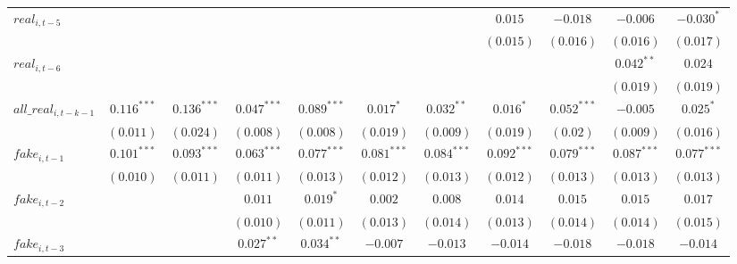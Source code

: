 \begin{table}
\begin{center}
\begin{tabular}{lcccccccccc}
\addlinespace
$real_{i, t-5}$          &                &               &                &                &                &                & $0.015$        & $-0.018$       & $-0.006$       & $-0.030^{*}$   \\
                         &                &               &                &                &                &                & $(0.015)$      & $(0.016)$      & $(0.016)$      & $(0.017)$      \\
\addlinespace
$real_{i, t-6}$       &                &               &                &                &                &                &                &                & $0.042^{**}$   & $0.024$        \\
                         &                &               &                &                &                &                &                &                & $(0.019)$      & $(0.019)$      \\
\addlinespace
$all\_real_{i, t-k-1}$  & $0.116^{***}$  & $0.136^{***}$   & $0.047^{***}$  & $0.089^{***}$ &  $0.017^{*}$    & $0.032^{**}$   & $0.016^{*}$    & $0.052^{***}$  &  $-0.005$       & $0.025^{*}$\\
                        & $(0.011)$      & $(0.024)$ &$(0.008)$      & $(0.008)$      & $(0.019)$      & $(0.009)$      & $(0.019)$   & $(0.02)$ & $(0.009)$      & $(0.016)$\\
\addlinespace
$fake_{i, t-1}$         & $0.101^{***}$  & $0.093^{***}$ & $0.063^{***}$  & $0.077^{***}$  & $0.081^{***}$  & $0.084^{***}$  & $0.092^{***}$  & $0.079^{***}$  & $0.087^{***}$  & $0.077^{***}$  \\
                         & $(0.010)$      & $(0.011)$     & $(0.011)$      & $(0.013)$      & $(0.012)$      & $(0.013)$      & $(0.012)$      & $(0.013)$      & $(0.013)$      & $(0.013)$      \\
\addlinespace
$fake_{i, t-2}$        &                &               & $0.011$        & $0.019^{*}$    & $0.002$        & $0.008$        & $0.014$        & $0.015$        & $0.015$        & $0.017$        \\
                         &                &               & $(0.010)$      & $(0.011)$      & $(0.013)$      & $(0.014)$      & $(0.013)$      & $(0.014)$      & $(0.014)$      & $(0.015)$      \\
\addlinespace
$fake_{i, t-3}$        &                &               & $0.027^{**}$   & $0.034^{**}$   & $-0.007$       & $-0.013$       & $-0.014$       & $-0.018$       & $-0.018$       & $-0.014$       \\

\end{tabular}
\end{center}
\end{table}
